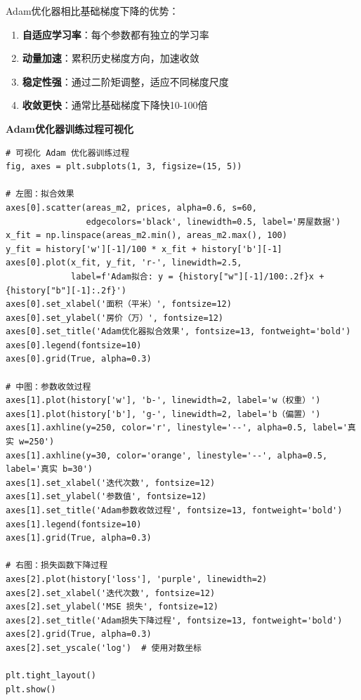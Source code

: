 \documentclass[10pt]{article}
\numberwithin{equation}{section}
\theoremstyle{plain}
\theoremstyle{definition}
\theoremstyle{remark}
\begin{document}
\begin{RemarkBox}[Adam优化器优势]
	Adam优化器相比基础梯度下降的优势：
	\begin{enumerate}
		\item \textbf{自适应学习率}：每个参数都有独立的学习率
		\item \textbf{动量加速}：累积历史梯度方向，加速收敛
		\item \textbf{稳定性强}：通过二阶矩调整，适应不同梯度尺度
		\item \textbf{收敛更快}：通常比基础梯度下降快10-100倍
	\end{enumerate}
\end{RemarkBox}

\textbf{Adam优化器训练过程可视化}

\begin{CodeBox}
	\begin{lstlisting}[style=PythonStyle]
# 可视化 Adam 优化器训练过程
fig, axes = plt.subplots(1, 3, figsize=(15, 5))

# 左图：拟合效果
axes[0].scatter(areas_m2, prices, alpha=0.6, s=60, 
                edgecolors='black', linewidth=0.5, label='房屋数据')
x_fit = np.linspace(areas_m2.min(), areas_m2.max(), 100)
y_fit = history['w'][-1]/100 * x_fit + history['b'][-1]
axes[0].plot(x_fit, y_fit, 'r-', linewidth=2.5, 
             label=f'Adam拟合: y = {history["w"][-1]/100:.2f}x + {history["b"][-1]:.2f}')
axes[0].set_xlabel('面积（平米）', fontsize=12)
axes[0].set_ylabel('房价（万）', fontsize=12)
axes[0].set_title('Adam优化器拟合效果', fontsize=13, fontweight='bold')
axes[0].legend(fontsize=10)
axes[0].grid(True, alpha=0.3)

# 中图：参数收敛过程
axes[1].plot(history['w'], 'b-', linewidth=2, label='w（权重）')
axes[1].plot(history['b'], 'g-', linewidth=2, label='b（偏置）')
axes[1].axhline(y=250, color='r', linestyle='--', alpha=0.5, label='真实 w=250')
axes[1].axhline(y=30, color='orange', linestyle='--', alpha=0.5, label='真实 b=30')
axes[1].set_xlabel('迭代次数', fontsize=12)
axes[1].set_ylabel('参数值', fontsize=12)
axes[1].set_title('Adam参数收敛过程', fontsize=13, fontweight='bold')
axes[1].legend(fontsize=10)
axes[1].grid(True, alpha=0.3)

# 右图：损失函数下降过程
axes[2].plot(history['loss'], 'purple', linewidth=2)
axes[2].set_xlabel('迭代次数', fontsize=12)
axes[2].set_ylabel('MSE 损失', fontsize=12)
axes[2].set_title('Adam损失下降过程', fontsize=13, fontweight='bold')
axes[2].grid(True, alpha=0.3)
axes[2].set_yscale('log')  # 使用对数坐标

plt.tight_layout()
plt.show()
\end{lstlisting}
\end{CodeBox}
\end{document}
